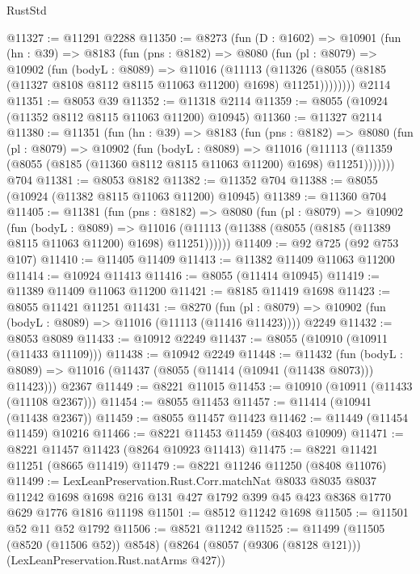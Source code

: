 \begin{lexlean}{RustStd}
\begin{coremodule}
@11327 := @11291 @2288
@11350 := @8273
    (fun (D : @1602) =>
    @10901
      (fun (hn : @39) =>
      @8183
        (fun (pns : @8182) =>
        @8080
          (fun (pl : @8079) =>
          @10902
            (fun (bodyL : @8089) =>
            @11016
              (@11113
                (@11326 (@8055 (@8185 (@11327 @8108 @8112 @8115 @11063 @11200) @1698) @11251))))))))
    @2114
@11351 := @8053 @39
@11352 := @11318 @2114
@11359 := @8055 (@10924 (@11352 @8112 @8115 @11063 @11200) @10945)
@11360 := @11327 @2114
@11380 := @11351
    (fun (hn : @39) =>
    @8183
      (fun (pns : @8182) =>
      @8080
        (fun (pl : @8079) =>
        @10902
          (fun (bodyL : @8089) =>
          @11016
            (@11113 (@11359 (@8055 (@8185 (@11360 @8112 @8115 @11063 @11200) @1698) @11251)))))))
    @704
@11381 := @8053 @8182
@11382 := @11352 @704
@11388 := @8055 (@10924 (@11382 @8115 @11063 @11200) @10945)
@11389 := @11360 @704
@11405 := @11381
    (fun (pns : @8182) =>
    @8080
      (fun (pl : @8079) =>
      @10902
        (fun (bodyL : @8089) =>
        @11016 (@11113 (@11388 (@8055 (@8185 (@11389 @8115 @11063 @11200) @1698) @11251))))))
@11409 := @92 @725 (@92 @753 @107)
@11410 := @11405 @11409
@11413 := @11382 @11409 @11063 @11200
@11414 := @10924 @11413
@11416 := @8055 (@11414 @10945)
@11419 := @11389 @11409 @11063 @11200
@11421 := @8185 @11419 @1698
@11423 := @8055 @11421 @11251
@11431 := @8270
    (fun (pl : @8079) => @10902 (fun (bodyL : @8089) => @11016 (@11113 (@11416 @11423))))
    @2249
@11432 := @8053 @8089
@11433 := @10912 @2249
@11437 := @8055 (@10910 (@10911 (@11433 @11109)))
@11438 := @10942 @2249
@11448 := @11432
    (fun (bodyL : @8089) => @11016 (@11437 (@8055 (@11414 (@10941 (@11438 @8073))) @11423)))
    @2367
@11449 := @8221 @11015
@11453 := @10910 (@10911 (@11433 (@11108 @2367)))
@11454 := @8055 @11453
@11457 := @11414 (@10941 (@11438 @2367))
@11459 := @8055 @11457 @11423
@11462 := @11449 (@11454 @11459) @10216
@11466 := @8221 @11453 @11459 (@8403 @10909)
@11471 := @8221 @11457 @11423 (@8264 @10923 @11413)
@11475 := @8221 @11421 @11251 (@8665 @11419)
@11479 := @8221 @11246 @11250 (@8408 @11076)
@11499 := LexLeanPreservation.Rust.Corr.matchNat
    @8033
    @8035
    @8037
    @11242
    @1698
    @1698
    @216
    @131
    @427
    @1792
    @399
    @45
    @423
    @8368
    @1770
    @629
    @1776
    @1816
    @11198
@11501 := @8512 @11242 @1698
@11505 := @11501 @52 @11 @52 @1792
@11506 := @8521 @11242
@11525 := @11499
    (@11505 (@8520 (@11506 @52)) @8548)
    (@8264 (@8057 (@9306 (@8128 @121))) (LexLeanPreservation.Rust.natArms @427))

\end{coremodule}
\end{lexlean}
